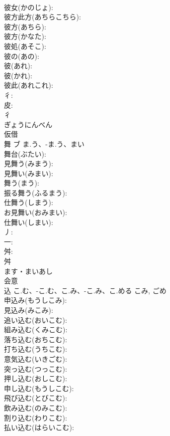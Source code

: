 \documentclass[8pt]{extreport}
\begin{document}
\begin{CJK}{UTF8}{min}
\\	彼女(かのじょ): 
\\	彼方此方(あちらこちら): 
\\	彼方(あちら): 
\\	彼方(かなた): 
\\	彼処(あそこ): 
\\	彼の(あの): 
\\	彼(あれ): 
\\	彼(かれ): 
\\	彼此(あれこれ): 
\\	彳: 
\\	皮: 
\\	彳	
\\	ぎょうにんべん	
\\	仮借 
\\	舞	ブ	ま.う、-ま.う、まい		
\\	舞台(ぶたい): 
\\	見舞う(みまう): 
\\	見舞い(みまい): 
\\	舞う(まう): 
\\	振る舞う(ふるまう): 
\\	仕舞う(しまう): 
\\	お見舞い(おみまい): 
\\	仕舞い(しまい): 
\\	丿: 
\\	一: 
\\	舛: 
\\	舛	
\\	ます・まいあし	
\\	会意 
\\	込		こ.む、-こ.む、こ.み、-こ.み、こ.める	こみ, ごめ	
\\	申込み(もうしこみ): 
\\	見込み(みこみ): 
\\	追い込む(おいこむ): 
\\	組み込む(くみこむ): 
\\	落ち込む(おちこむ): 
\\	打ち込む(うちこむ): 
\\	意気込む(いきごむ): 
\\	突っ込む(つっこむ): 
\\	押し込む(おしこむ): 
\\	申し込む(もうしこむ): 
\\	飛び込む(とびこむ): 
\\	飲み込む(のみこむ): 
\\	割り込む(わりこむ): 
\\	払い込む(はらいこむ): 

\end{CJK}
\end{document}

